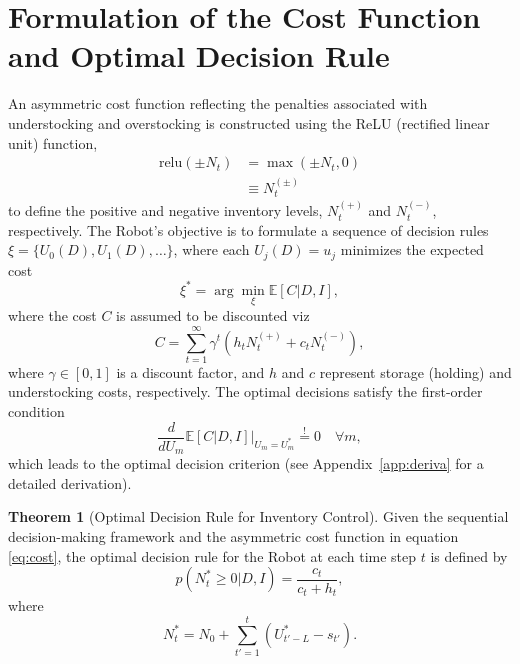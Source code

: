 \documentclass[a4paper,12pt]{article}
\theoremstyle{definition}
\newtheorem{theorem}{Theorem}
\begin{document}
	\section{Formulation of the Cost Function and Optimal Decision Rule}
	An asymmetric cost function reflecting the penalties associated with understocking and overstocking is constructed using the ReLU (rectified linear unit) function,
	\begin{equation}
		\begin{split}
			\text{relu}(\pm N_t) &= \max(\pm N_t, 0)\\
			&\equiv N_t^{(\pm)}
		\end{split}
	\end{equation}
	to define the positive and negative inventory levels, $N_t^{(+)}$ and $N_t^{(-)}$, respectively. The Robot’s objective is to formulate a sequence of decision rules $\xi = \{U_0(D), U_1(D), \dots\}$, where each $U_j(D) = u_j$ minimizes the expected cost
	\begin{equation}
		\xi^* = \arg \min_{\xi} \mathbb{E}[C | D, I],
	\end{equation}
	where the cost $C$ is assumed to be discounted viz
	\begin{equation}
		C = \sum_{t=1}^{\infty} \gamma^{t} \left( h_t N_t^{(+)} + c_t N_{t}^{(-)} \right),
		\label{eq:cost}
	\end{equation}
	where $\gamma \in [0,1]$ is a discount factor, and $h$ and $c$ represent storage (holding) and understocking costs, respectively. The optimal decisions satisfy the first-order condition
	\begin{equation}
		\frac{d}{dU_m} \mathbb{E}[C | D, I] \Big|_{U_m = U_m^*} \overset{!}{=} 0 \quad \forall m,
		\label{eq:min_exp_cost}
	\end{equation}
	which leads to the optimal decision criterion (see Appendix~\ref{app:deriva} for a detailed derivation).
	
	\begin{theorem}[Optimal Decision Rule for Inventory Control]
		Given the sequential decision-making framework and the asymmetric cost function in equation \eqref{eq:cost}, the optimal decision rule for the Robot at each time step $t$ is defined by
		\begin{equation}
			p(N_t^* \geq 0 | D, I) = \frac{c_t}{c_t + h_t},
		\end{equation}
		where
		\begin{equation}
			N_t^* = N_0 + \sum_{t'=1}^{t} (U_{t'-L}^* - s_{t'}).
		\end{equation}
	\end{theorem}
	
\end{document}
